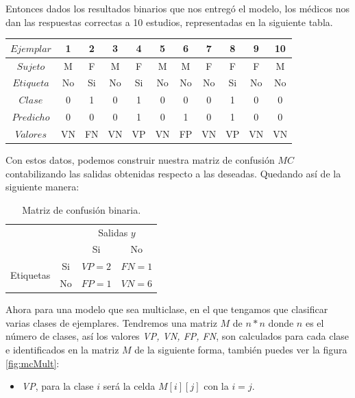 \begin{description}
\begin{example}
   Entonces dados los resultados binarios que nos entregó el modelo, los médicos nos dan las respuestas correctas a 10
   estudios, representadas en la siguiente tabla.
 
   \begin{center}
     \begin{tabular}{c|cccccccccc}

      $Ejemplar$ & 1   & 2  & 3  & 4  & 5  & 6  & 7  & 8  & 9  & 10  \\ \hline
      $Sujeto$   & M   & F  & M  & F  & M  & M  & F  & F  & F  & M  \\ \hline
      $Etiqueta$ & No  & Si & No & Si & No & No & No & Si & No & No  \\ \hline
      $Clase$    & 0   & 1  & 0  & 1  & 0  & 0  & 0  & 1  & 0  & 0  \\ \hline
      $Predicho$ & 0   & 0  & 0  & 1  & 0  & 1  & 0  & 1  & 0  & 0  \\ \hline
      $Valores$  & VN  & FN & VN & VP & VN & FP & VN & VP & VN & VN  \\ \hline
   
     \end{tabular}
   \end{center}

   Con estos datos, podemos construir nuestra matriz de confusión $MC$ contabilizando las salidas obtenidas respecto a las deseadas. Quedando así de la siguiente manera:

   \begin{table}[H]
    \begin{center}
     \begin{tabular}{|c|c|c|c|}
     \cline{3-4}
     \multicolumn{2}{c|}{} & \multicolumn{2}{c|}{Salidas $y$} \\
     \cline{3-4}
     \multicolumn{2}{c|}{} & Si & No \\
     \hline
     \multirow{3}{*}{Etiquetas} & Si & $VP = 2$ & $FN = 1$ \\
     \cline{2-4}
     & No & $FP=1$ & $VN = 6$  \\
     \hline
     \end{tabular}
    \end{center}
    \caption{Matriz de confusión binaria.}
    \label{Table2}
   \end{table}

\label{ej:binario}
\end{example}
 
 
 Ahora para una modelo que sea multiclase, en el que tengamos que clasificar varias clases de ejemplares. Tendremos una matriz $M$ de $n * n$ donde $n$ es el número de clases, así los valores \emph{VP, VN, FP, FN}, son calculados para cada clase e identificados en la matriz $M$ de la siguiente forma, también puedes ver la figura \ref{fig:mcMult}:
 \begin{itemize}
  \item \emph{VP}, para la clase $i$ será la celda $M[i][j]$ con la $i = j$.
  

\end{itemize}
\end{description}
